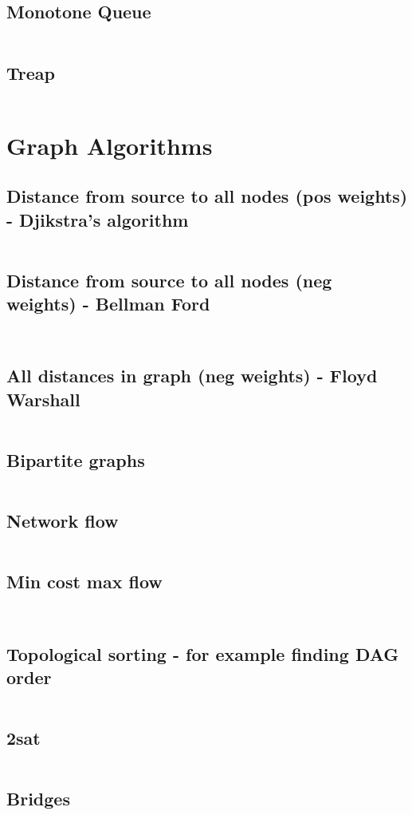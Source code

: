 \documentclass[8pt,a4paper,landscape,oneside]{amsart}
\newcommand{\codej}[1]{\inputminted[fontsize=\large,tabsize=2,baselinestretch=1]{java}{code/#1}}
\newcommand{\codec}[1]{\inputminted[fontsize=\large,tabsize=2,baselinestretch=1]{cpp}{code/#1}}
\newcommand{\codep}[1]{\inputminted[fontsize=\large,tabsize=2,baselinestretch=1]{py}{code/#1}}
\begin{document}
\begin{multicols*}{2}
\begin{large}
\subsection{Monotone Queue}
\codep{monotonequeue.py}
\subsection{Treap}
\codec{Treap.cpp}
\section{Graph Algorithms}
\subsection{Distance from source to all nodes (pos weights) - Djikstra's algorithm}
\codep{dijkstra.py}
\subsection{Distance from source to all nodes (neg weights) - Bellman Ford}
\codep{bellmanford.py}
\codec{bellmanford.cpp}
\subsection{All distances in graph (neg weights) - Floyd Warshall}
\codep{floydwarshall.py}
\subsection{Bipartite graphs}
\codec{kuhns.cpp}
\subsection{Network flow}
\codec{dinic.cpp}
\subsection{Min cost max flow}
\codep{mincostmaxflow.py}
\codej{mincostmaxflow.cpp}
\subsection{Topological sorting - for example finding DAG order}
\codep{topsort.py}
\subsection{2sat}
\codec{2sat.cpp}
\subsection{Bridges}
\codec{bridges.cpp}

\end{large}
\end{multicols*}
\end{document}
